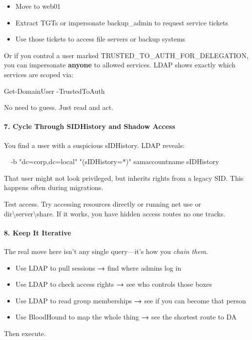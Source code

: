 \begin{itemize}
    \item Move to web01

    \item Extract TGTs or impersonate backup\_admin to request service tickets

    \item Use those tickets to access file servers or backup systems

\end{itemize}
Or if you control a user marked TRUSTED\_TO\_AUTH\_FOR\_DELEGATION, you can impersonate \textbf{anyone} to allowed services. LDAP shows exactly which services are scoped via:

Get-DomainUser -TrustedToAuth

No need to guess. Just read and act.

\paragraph{\textbf{   7. Cycle Through SIDHistory and Shadow Access}}

You find a user with a suspicious sIDHistory. LDAP reveals:


  -b "dc=corp,dc=local" "(sIDHistory=*)" samaccountname sIDHistory

That user might not look privileged, but inherits rights from a legacy SID. This happens often during migrations.

Test access. Try accessing resources directly or running net use or dir\textbackslash{}server\textbackslash{}share. If it works, you have hidden access routes no one tracks.

\paragraph{\textbf{8. Keep It Iterative}}

The real move here isn’t any single query—it’s how you \textit{chain them}.

\begin{itemize}
    \item Use LDAP to pull sessions \textbf{→} find where admins log in
    \item Use LDAP to check access rights \textbf{→} see who controls those boxes
    \item Use LDAP to read group memberships \textbf{→} see if you can become that person
    \item Use BloodHound to map the whole thing \textbf{→} see the shortest route to DA

\end{itemize}
Then execute.

